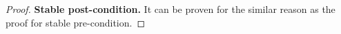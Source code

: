 \begin{proof}
\textbf{Stable post-condition.} 
It can be proven for the similar reason as the proof for stable pre-condition.
\end{proof}
